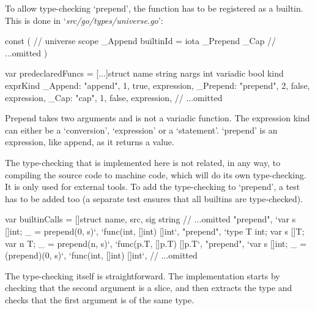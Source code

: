To allow type-checking `prepend', the function has to be registered as a builtin.
This is done in `\textit{src/go/types/universe.go}':

\begin{gocode}
const (
	// universe scope
	_Append builtinId = iota
	_Prepend
	_Cap
    // ...omitted
)

var predeclaredFuncs = [...]struct {
	name     string
	nargs    int
	variadic bool
	kind     exprKind
}{
	_Append:  {"append", 1, true, expression},
	_Prepend: {"prepend", 2, false, expression},
	_Cap:     {"cap", 1, false, expression},
    // ...omitted
}
\end{gocode}

Prepend takes two arguments and is not a variadic function. The expression kind can either be a `conversion',
`expression' or a `statement'. `prepend' is an expression, like append, as it returns a value.


The type-checking that is implemented here is not related, in any way, to compiling the source code to machine code, which will do its own type-checking. It is only used for external tools.
To add the type-checking to `prepend', a test has to be added too (a separate
test ensures that all builtins are type-checked).

\begin{gocode}
var builtinCalls = []struct {
	name, src, sig string
}{
	// ...omitted
	{"prepend", `var s []int; _ = prepend(0, s)`, `func(int, []int) []int`},
	{"prepend", `type T int; var s []T; var n T; _ = prepend(n, s)`, `func(p.T, []p.T) []p.T`},
	{"prepend", `var s []int; _ = (prepend)(0, s)`, `func(int, []int) []int`},
    // ...omitted
}
\end{gocode}

The type-checking itself is straightforward. The implementation starts by checking that the second
argument is a slice, and then extracts the type and checks that the first argument is of the same type.

